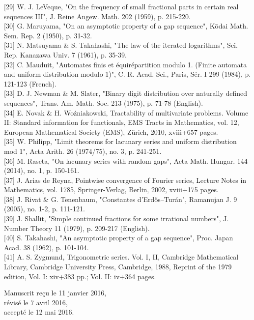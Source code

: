 \documentclass[10pt]{article}
\newcommand{\1}{\mathbf{1}}
\begin{document}
[29] W. J. LeVeque, "On the frequency of small fractional parts in certain real sequences III", J. Reine Angew. Math. 202 (1959), p. 215-220.\\[0pt]
[30] G. Maruyama, "On an asymptotic property of a gap sequence", Kōdai Math. Sem. Rep. 2 (1950), p. 31-32.\\[0pt]
[31] N. Matsuyama \& S. Takahashi, "The law of the iterated logarithms", Sci. Rep. Kanazawa Univ. 7 (1961), p. 35-39.\\[0pt]
[32] C. Mauduit, "Automates finis et équirépartition modulo 1. (Finite automata and uniform distribution modulo 1)", C. R. Acad. Sci., Paris, Sér. I 299 (1984), p. 121-123 (French).\\[0pt]
[33] D. J. Newman \& M. Slater, "Binary digit distribution over naturally defined sequences", Trans. Am. Math. Soc. 213 (1975), p. 71-78 (English).\\[0pt]
[34] E. Novak \& H. Woźniakowski, Tractability of multivariate problems. Volume II: Standard information for functionals, EMS Tracts in Mathematics, vol. 12, European Mathematical Society (EMS), Zürich, 2010, xviii+657 pages.\\[0pt]
[35] W. Philipp, "Limit theorems for lacunary series and uniform distribution mod 1", Acta Arith. 26 (1974/75), no. 3, p. 241-251.\\[0pt]
[36] M. Raseta, "On lacunary series with random gaps", Acta Math. Hungar. 144 (2014), no. 1, p. 150-161.\\[0pt]
[37] J. Arias de Reyna, Pointwise convergence of Fourier series, Lecture Notes in Mathematics, vol. 1785, Springer-Verlag, Berlin, 2002, xviii+175 pages.\\[0pt]
[38] J. Rivat \& G. Tenenbaum, "Constantes d'Erdős--Turán", Ramanujan J. 9 (2005), no. 1-2, p. 111-121.\\[0pt]
[39] J. Shallit, "Simple continued fractions for some irrational numbers", J. Number Theory 11 (1979), p. 209-217 (English).\\[0pt]
[40] S. Takahashi, "An asymptotic property of a gap sequence", Proc. Japan Acad. 38 (1962), p. 101-104.\\[0pt]
[41] A. S. Zygmund, Trigonometric series. Vol. I, II, Cambridge Mathematical Library, Cambridge University Press, Cambridge, 1988, Reprint of the 1979 edition, Vol. I: xiv+383 pp.; Vol. II: iv+364 pages.

Manuscrit reçu le 11 janvier 2016,\\
révisé le 7 avril 2016,\\
accepté le 12 mai 2016.
\end{document}
